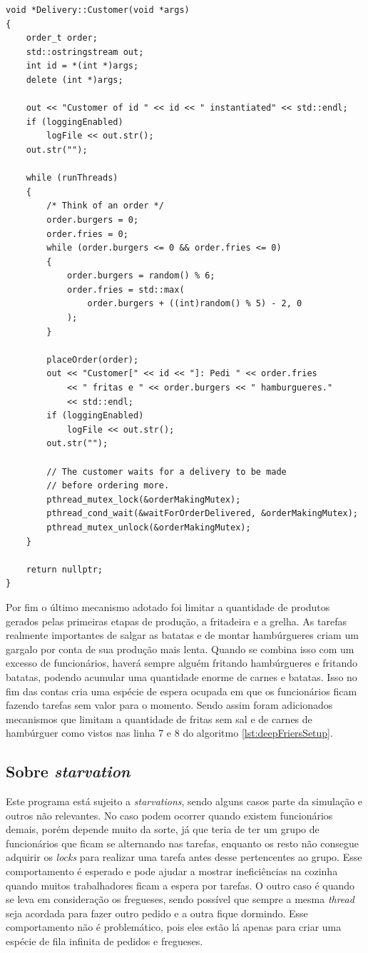 \documentclass[a4paper]{article}
\begin{document}
\begin{lstlisting}[caption=Código executado pela \textit{thread} de freguês.\label{lst:customerThread}]
void *Delivery::Customer(void *args)
{
	order_t order;
	std::ostringstream out;
	int id = *(int *)args;
	delete (int *)args;
	
	out << "Customer of id " << id << " instantiated" << std::endl;
	if (loggingEnabled)
		logFile << out.str();
	out.str("");
	
	while (runThreads)
	{
		/* Think of an order */
		order.burgers = 0;
		order.fries = 0;
		while (order.burgers <= 0 && order.fries <= 0)
		{
			order.burgers = random() % 6;
			order.fries = std::max(
				order.burgers + ((int)random() % 5) - 2, 0
			);
		}
		
		placeOrder(order);
		out << "Customer[" << id << "]: Pedi " << order.fries 
			<< " fritas e " << order.burgers << " hamburgueres." 
			<< std::endl;
		if (loggingEnabled)
			logFile << out.str();
		out.str("");
		
		// The customer waits for a delivery to be made 
		// before ordering more.
		pthread_mutex_lock(&orderMakingMutex);
		pthread_cond_wait(&waitForOrderDelivered, &orderMakingMutex);
		pthread_mutex_unlock(&orderMakingMutex);
	}
	
	return nullptr;
}
\end{lstlisting}

Por fim o último mecanismo adotado foi limitar a quantidade de produtos gerados pelas primeiras etapas de produção, a fritadeira e a grelha. As tarefas realmente importantes de salgar as batatas e de montar hambúrgueres criam um gargalo por conta de sua produção mais lenta. Quando se combina isso com um excesso de funcionários, haverá sempre alguém fritando hambúrgueres e fritando batatas, podendo acumular uma quantidade enorme de carnes e batatas. Isso no fim das contas cria uma espécie de espera ocupada em que os funcionários ficam fazendo tarefas sem valor para o momento. Sendo assim foram adicionados mecanismos que limitam a quantidade de fritas sem sal e de carnes de hambúrguer como vistos nas linha 7 e 8 do algoritmo \ref{lst:deepFriersSetup}.

\subsection{Sobre \textit{starvation}}
\label{sec:aboutStarvation}

Este programa está sujeito a \textit{starvations}, sendo alguns casos parte da simulação e outros não relevantes. No caso podem ocorrer quando existem funcionários demais, porém depende muito da sorte, já que teria de ter um grupo de funcionários que ficam se alternando nas tarefas, enquanto os resto não consegue adquirir os \textit{locks} para realizar uma tarefa antes desse pertencentes ao grupo. Esse comportamento é esperado e pode ajudar a mostrar ineficiências na cozinha quando muitos trabalhadores ficam a espera por tarefas. O outro caso é quando se leva em consideração os fregueses, sendo possível que sempre a mesma \textit{thread} seja acordada para fazer outro pedido e a outra fique dormindo. Esse comportamento não é problemático, pois eles estão lá apenas para criar uma espécie de fila infinita de pedidos e fregueses.
\end{document}
